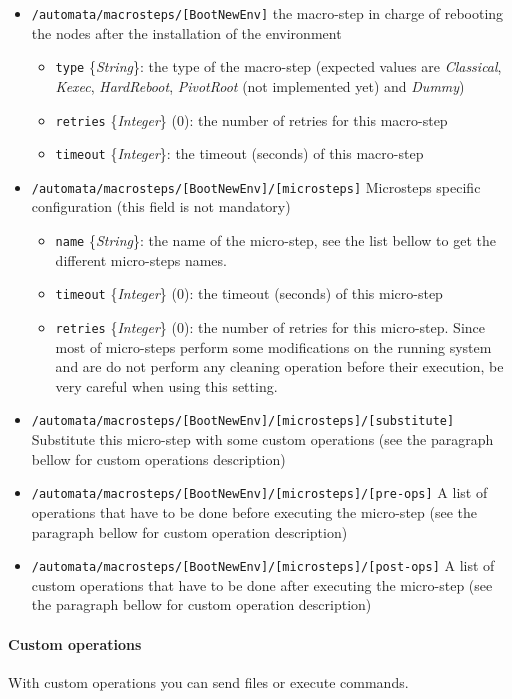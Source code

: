\documentclass[a4wide,10pt,oneside]{book}
\newcommand{\ypath}[1]{\texttt{#1}}
\newcommand{\yfield}[2]{\texttt{#1} {\small\{{\emph{#2}}\}}:}
\newcommand{\yfieldd}[3]{\texttt{#1} {\small\{{\emph{#2}}\}} {\small(}#3{\small)}:}
\begin{document}
\begin{itemize}
  \item \ypath{/automata/macrosteps/[BootNewEnv]} the macro-step in charge of rebooting the nodes after the installation of the environment
  \begin{itemize}
    \item \yfield{type}{String} the type of the macro-step (expected values are \emph{Classical}, \emph{Kexec}, \emph{HardReboot}, \emph{PivotRoot} (not implemented yet) and \emph{Dummy})
    \item \yfieldd{retries}{Integer}{0} the number of retries for this macro-step
    \item \yfield{timeout}{Integer} the timeout (seconds) of this macro-step
  \end{itemize} 
  \item \ypath{/automata/macrosteps/[BootNewEnv]/[microsteps]} Microsteps specific configuration (this field is not mandatory)
  \begin{itemize}
    \item \yfield{name}{String} the name of the micro-step, see the list bellow to get the different micro-steps names.
    \item \yfieldd{timeout}{Integer}{0} the timeout (seconds) of this micro-step
    \item \yfieldd{retries}{Integer}{0} the number of retries for this micro-step. Since most of micro-steps perform some modifications on the running system and are do not perform any cleaning operation before their execution, be very careful when using this setting.
  \end{itemize} 
  \item \ypath{/automata/macrosteps/[BootNewEnv]/[microsteps]/[substitute]} Substitute this micro-step with some custom operations (see the paragraph bellow for custom operations description)
  \item \ypath{/automata/macrosteps/[BootNewEnv]/[microsteps]/[pre-ops]} A list of operations that have to be done before executing the micro-step (see the paragraph bellow for custom operation description)
  \item \ypath{/automata/macrosteps/[BootNewEnv]/[microsteps]/[post-ops]} A list of custom operations that have to be done after executing the micro-step (see the paragraph bellow for custom operation description)
\end{itemize}
\paragraph{Custom operations\label{custom-op}\\}
With custom operations you can send files or execute commands.
\end{document}
